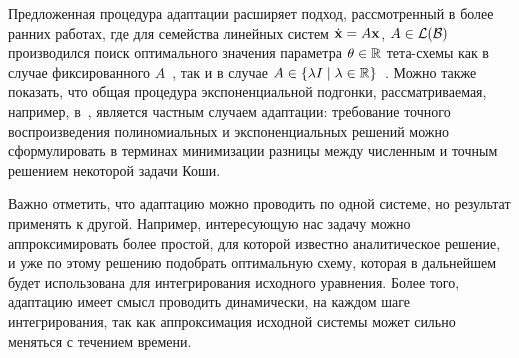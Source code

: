 Предложенная процедура адаптации расширяет подход,
рассмотренный в более ранних работах,
где для семейства линейных систем $ \dot{\mathbf{x}} = A \mathbf{x} $, $ A \in \mathcal{L}(\mathcal{B}) $
производился поиск оптимального значения параметра $ \theta \in \mathbb{R} $ тета-схемы
как в случае фиксированного $ A $~\cite{liniger1970efficient_integration_methods, lambert1991methods, berzins1992adaptive_theta_method},
так и в случае $ A \in \{ \lambda I \mid \lambda \in \mathbb{R} \} $~\cite{liniger1969global_accuracy, johnson1988tunable_integration_method}.
Можно также показать, что общая процедура экспоненциальной подгонки,
рассматриваемая, например, в~\cite{hollevoet2013exponential_fitting},
является частным случаем адаптации:
требование точного воспроизведения полиномиальных и экспоненциальных решений
можно сформулировать в терминах минимизации разницы между численным и точным решением некоторой задачи Коши.

Важно отметить, что адаптацию можно проводить по одной системе,
но результат применять к другой.
Например, интересующую нас задачу можно аппроксимировать более простой,
для которой известно аналитическое решение,
и уже по этому решению подобрать оптимальную схему,
которая в дальнейшем будет использована для интегрирования исходного уравнения.
Более того, адаптацию имеет смысл проводить динамически,
на каждом шаге интегрирования,
так как аппроксимация исходной системы может сильно меняться с течением времени.

